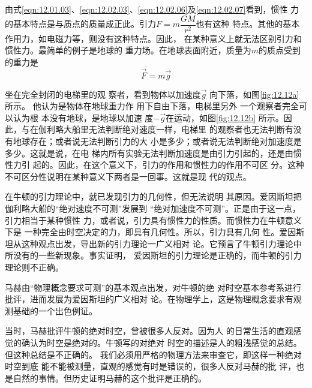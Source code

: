 由式\eqref{eqn:12.01.03}、\eqref{eqn:12.02.03}、\eqref{eqn:12.02.06}及\eqref{eqn:12.02.07}看到，惯性
力的基本特点是与质点的质量成正此。引力$ F = m \dfrac { G M } { r ^ { 2 } } $也有这种
特点。其他的基本作用力，如电磁力等，则没有这种特点。因此，
在某种意义上就无法区别引力和惯性力。最简单的例子是地球的
重力场。在地球表面附近，质量为$ m $的质点受到的重力是
\begin{equation*}
  \vec{F} = m \vec{g}
\end{equation*}
\begin{figure}
  \vspace{-2em}
  \centering
  \caption{}
  \label{fig:12.12}
\end{figure}
坐在完全封闭的电梯里的观
察者，看到物体以加速度$ \vec{g} $
向下落，如图\ref{fig:12.12a}所示。
他认为是物体在地球重力作
用下自由下落，电梯里另外
一个观察者完全可以认为根
本没有地球，是地球以加速
度$-\vec{g}$在运动，如图\ref{fig:12.12b}
所示。因此，与在伽利略大船里无法判断绝对速度一样，电梯里
的观察者也无法判断有没有地球存在；或者说无法判断引力的大
小是多少；或者说无法判断绝对加速度是多少。这就是说，在电
梯内所有实验无法判断加速度是由引力引起的，还是由惯性力引
起的。因此，在这个意义下，引力的作用和惯性力的作用不可区
分。这种不可区分性说明在某种意义下两者是一回事。这就是现
代的观点。

在牛顿的引力理论中，就已发现引力的几何性，但无法说明
其原因。爱因斯坦把伽利略大船的“绝对速度不可测”发展到
“绝对加速度不可测”。正是由于这一点，引力相当于某种惯性
力，或者说，引力具有惯性力的性质。而惯性力在牛顿意义下是
一种完全由时空决定的力，即具有几何性。所以，引力具有几何
性。爱因斯坦从这种观点出发，导出新的引力理论一广义相对
论。它预言了牛顿引力理论中所没有的一些新现象。事实证明，
爱因斯坦的引力理论是正确的，而牛顿的引力理论则不正确。

{马\ziju{-0.005pt}赫由“物理概念要求可测”的基本观点出发，对牛顿的绝
对时空基本参考系进行批评，进而发展为爱因斯坦的广义相对
论。在物理学上，这是物理概念要求有观测基础的一个出色例证。}

当时，马赫批评牛顿的绝对时空，曾被很多人反对。因为人
的日常生活的直观感觉的确认为时空是绝对的。牛顿写的对绝对
时空的描述是人的粗浅感觉的总结。但这种总结是不正确的。
我们必须用严格的物理方法来审查它，即这样一种绝对时空到底
能不能被测量，直观的感觉有时是错误的，很多人反对马赫的批
评，也是自然的事情。但历史证明马赫的这个批评是正确的。

